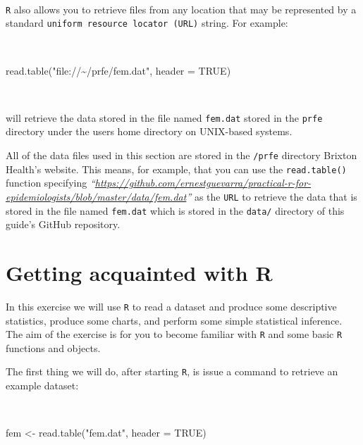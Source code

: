 \documentclass[
  12pt,
  a4paper]{book}
\newenvironment{Shaded}{\begin{snugshade}}{\end{snugshade}}
\newcommand{\AttributeTok}[1]{\textcolor[rgb]{0.77,0.63,0.00}{#1}}
\newcommand{\ConstantTok}[1]{\textcolor[rgb]{0.00,0.00,0.00}{#1}}
\newcommand{\FunctionTok}[1]{\textcolor[rgb]{0.00,0.00,0.00}{#1}}
\newcommand{\NormalTok}[1]{#1}
\newcommand{\OtherTok}[1]{\textcolor[rgb]{0.56,0.35,0.01}{#1}}
\newcommand{\StringTok}[1]{\textcolor[rgb]{0.31,0.60,0.02}{#1}}
\begin{document}
~

\texttt{R} also allows you to retrieve files from any location that may be represented by a standard \texttt{uniform\ resource\ locator\ (URL)} string. For example:

~

\begin{Shaded}
\begin{Highlighting}[]
\FunctionTok{read.table}\NormalTok{(}\StringTok{"file://\textasciitilde{}/prfe/fem.dat"}\NormalTok{, }\AttributeTok{header =} \ConstantTok{TRUE}\NormalTok{)}
\end{Highlighting}
\end{Shaded}

~

will retrieve the data stored in the file named \texttt{fem.dat} stored in the \texttt{prfe} directory under the users home directory on UNIX-based systems.

All of the data files used in this section are stored in the \texttt{/prfe} directory Brixton Health's website. This means, for example, that you can use the \texttt{read.table()} function specifying \emph{``\url{https://github.com/ernestguevarra/practical-r-for-epidemiologists/blob/master/data/fem.dat}''} as the \texttt{URL} to retrieve the data that is stored in the file named \texttt{fem.dat} which is stored in the \texttt{data/} directory of this guide's GitHub repository.

\hypertarget{exercise1}{%
\chapter{Getting acquainted with R}\label{exercise1}}

In this exercise we will use \texttt{R} to read a dataset and produce some descriptive statistics, produce some charts, and perform some simple statistical inference. The aim of the exercise is for you to become familiar with \texttt{R} and some basic \texttt{R} functions and objects.

The first thing we will do, after starting \texttt{R}, is issue a command to retrieve an example dataset:

~

\begin{Shaded}
\begin{Highlighting}[]
\NormalTok{fem }\OtherTok{\textless{}{-}} \FunctionTok{read.table}\NormalTok{(}\StringTok{"fem.dat"}\NormalTok{, }\AttributeTok{header =} \ConstantTok{TRUE}\NormalTok{)}
\end{Highlighting}
\end{Shaded}
\end{document}
